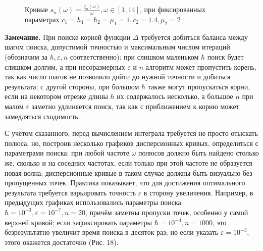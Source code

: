 \documentclass[a4paper, 12pt]{article}
\begin{document}
\begin{figure}[h!]
\noindent{}
\caption{Кривые $s_n(\omega)=\frac{\zeta_n(\omega)}{\omega}, \omega \in [1,14]$, при фиксированных параметрах $c_1=h_1=h_2=\mu_1=1,c_2=1.4,\mu_2=2$}
\label{figCurves}
\end{figure}

{\bf Замечание.} При поиске корней функции $\Delta$ требуется добиться баланса между шагом поиска, допустимой точностью и максимальным числом итераций (обозначим за $\hbar, \varepsilon, n$ соответственно): 
при слишком маленьком $\hbar$ поиск будет слишком долгим, а при несоразмерных $\varepsilon$ и $n$ алгоритм может пропустить корень, так как число шагов не позволило дойти до нужной точности и добиться результата;
с другой стороны, при большом $\hbar$ также могут пропускаться корни, если на некотором отрезке длины $\hbar$ их содержалось несколько, а большое $n$ при малом $\varepsilon$ заметно удлиняется поиск, так как с приближением к корню может замедляться сходимость.

С учётом сказанного, перед вычислением интеграла требуется не просто отыскать полюса, но, построив несколько графиков дисперсионных кривых, определиться с параметрами поиска: при любой частоте $\omega$ полюсов должно быть найдено столько же, сколько и на соседних частотах, если только при этой частоте не образуется новая волна; дисперсионные кривые в таком случае должны быть визуально без пропущенных точек.
Практика показывает, что для достижения оптимального результата требуется варьировать точность $\varepsilon$ в сторону увеличения. Например, в предыдущих графиках использовались параметры поиска $\hbar=10^{-3}, \varepsilon=10^{-7}, n=20$, причём заметны пропуски точек, особенно у самой верхней кривой; если зафиксировать параметры $\hbar = 10^{-4}, n=1000$, это безрезультатно увеличит время поиска в десяток раз; но если указать $\varepsilon = 10^{-3}$, этого окажется достаточно (Рис. 18).
\end{document}
